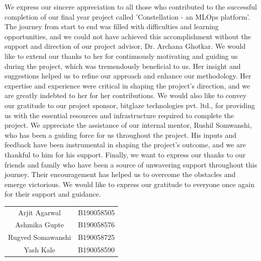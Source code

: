 \documentclass[12pt,a4paper]{report}     %
\begin{document}
		\begin{normalsize}
{\setlength{\baselineskip}{1.1\baselineskip}
\noindent %
We express our sincere appreciation to all those who contributed to the successful completion of our final year project called 'Constellation - an MLOps platform'. The journey from start to end was filled with difficulties and learning opportunities, and we could not have achieved this accomplishment without the support and direction of our project advisor, Dr. Archana Ghotkar.
\newline
We would like to extend our thanks to her for continuously motivating and guiding us during the project, which was tremendously beneficial to us. Her insight and suggestions helped us to refine our approach and enhance our methodology. Her expertise and experience were critical in shaping the project's direction, and we are greatly indebted to her for her contributions.
\newline
We would also like to convey our gratitude to our project sponsor, bitglaze technologies pvt. ltd., for providing us with the essential resources and infrastructure required to complete the project. We appreciate the assistance of our internal mentor, Rushil Somwanshi, who has been a guiding force for us throughout the project. His inputs and feedback have been instrumental in shaping the project's outcome, and we are thankful to him for his support.
\newline
Finally, we want to express our thanks to our friends and family who have been a source of unwavering support throughout this journey. Their encouragement has helped us to overcome the obstacles and emerge victorious.
\newline
We would like to express our gratitude to everyone once again for their support and guidance.












			\vspace{1.8in}
				\begin{flushright} 
\begin{tabular}{ c c }
    
    Arjit Agarwal & B190058505 \\
    Ashmika Gupte & B190058576 \\
    Rugved Somawanshi & B190058725 \\
    Yash Kale & B190058590 \\
\end{tabular}
 \end{flushright}

}
		\end{normalsize}
		
\end{document}
